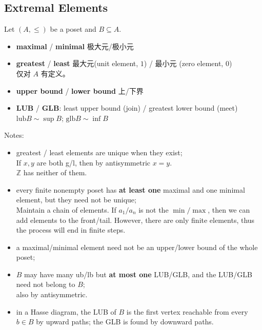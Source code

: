\documentclass[12pt, a4paper, UTF8, openany]{ctexbook}
\newcommand{\field}[1]{\mathbb{#1}}%
\begin{document}
        \subsection{Extremal Elements}
            Let $(A, \le)$ be a poset and $B \subseteq A$.
            \begin{itemize}
                \item \textbf{maximal} / \textbf{minimal} 极大元/极小元
                \item \textbf{greatest} / \textbf{least} 最大元(unit element, $1$) / 最小元 (zero element, $0$)\\
                    仅对 $A$ 有定义。
                \item \textbf{upper bound} / \textbf{lower bound} 上/下界
                \item \textbf{LUB} / \textbf{GLB}: least upper bound (join) / greatest lower bound (meet) \\
                    $\text{lub} B \sim \sup B$; $\text{glb} B \sim \inf B$
            \end{itemize}

            Notes:
            \begin{itemize}
                \item greatest / least elements are unique when they exist; \\
                    If $x, y$ are both g/l, then by antisymmetric $x = y$. \\
                    $\field{Z}$ has neither of them.
                \item every finite nonempty poset has \textbf{at least one} maximal and one minimal element, but they need not be unique; \\
                    Maintain a chain of elements. If $a_1/a_n$ is not the $\min/\max$, then we can add elements to the front/tail. However, there are only finite elements, thus the process will end in finite steps.
                \item a maximal/minimal element need not be an upper/lower bound of the whole poset;
                \item $B$ may have many ub/lb but \textbf{at most one} LUB/GLB, and the LUB/GLB need not belong to $B$;\\
                    also by antisymmetric.
                \item in a Hasse diagram, the LUB of $B$ is the first vertex reachable from every $b \in B$ by upward paths; the GLB is found by downward paths.
            \end{itemize}
\end{document}
